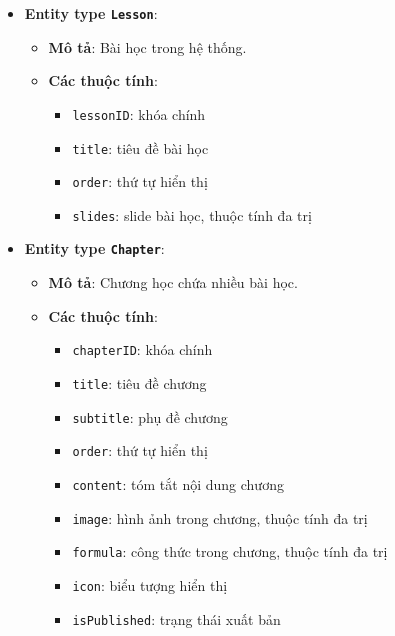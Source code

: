 \begin{itemize}
\begin{itemize}
    \item \textbf{Chuyên biệt hóa}: ràng buộc \textbf{disjoint}.
    \begin{itemize}
        \item General Practice Test
        \item Lesson Practice Test
    \end{itemize}
\end{itemize}


\item \textbf{Entity type \texttt{Lesson}}:
\begin{itemize}
    \item \textbf{Mô tả}: Bài học trong hệ thống.
    
    \item \textbf{Các thuộc tính}:
    \begin{itemize}
        \item \texttt{lessonID}: khóa chính
        \item \texttt{title}: tiêu đề bài học
        \item \texttt{order}: thứ tự hiển thị
        \item \texttt{slides}: slide bài học, thuộc tính đa trị
    \end{itemize}
\end{itemize}


\item \textbf{Entity type \texttt{Chapter}}:
\begin{itemize}
    \item \textbf{Mô tả}: Chương học chứa nhiều bài học.
    
    \item \textbf{Các thuộc tính}:
    \begin{itemize}
        \item \texttt{chapterID}: khóa chính
        \item \texttt{title}: tiêu đề chương
        \item \texttt{subtitle}: phụ đề chương
        \item \texttt{order}: thứ tự hiển thị
        \item \texttt{content}: tóm tắt nội dung chương
        \item \texttt{image}: hình ảnh trong chương, thuộc tính đa trị
        \item \texttt{formula}: công thức trong chương, thuộc tính đa trị
        \item \texttt{icon}: biểu tượng hiển thị
        \item \texttt{isPublished}: trạng thái xuất bản
    \end{itemize}
\end{itemize}



\end{itemize}
